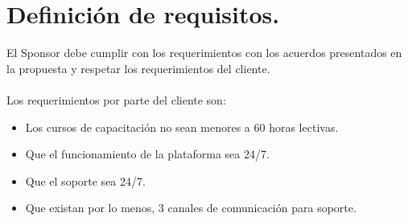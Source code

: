 \chapter{Definici\'on de requisitos.}
%
El Sponsor debe cumplir con los requerimientos con los acuerdos presentados en
la propuesta y respetar los requerimientos del cliente.\\%
%
\\Los requerimientos por parte del cliente son:
%
\begin{itemize}
	\item Los cursos de capacitaci\'on no sean menores a 60 horas lectivas.
	\item Que el funcionamiento de la plataforma sea 24/7.
	\item Que el soporte sea 24/7.
	\item Que existan por lo menos, 3 canales de comunicaci\'on para soporte.
\end{itemize}